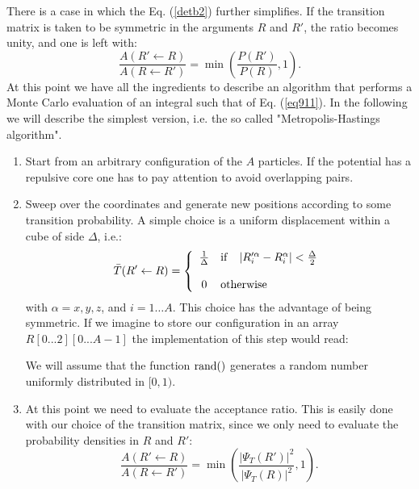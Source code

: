 There is a case in which the Eq. (\ref{detb2}) further simplifies. If the transition matrix is taken to 
be symmetric in the arguments $R$ and $R'$, the ratio becomes unity, and one is left with:
\begin{equation}
\frac{A(R'\leftarrow R)}{A(R\leftarrow R')}=\min\left(\frac{P(R')}{P(R)},1\right).
\label{detb2}
\end{equation} 
At this point we have all the ingredients to describe an algorithm that performs a Monte Carlo evaluation
of an integral such that of Eq. (\ref{eq911}). In the following we will describe the simplest version,
i.e. the so called "Metropolis-Hastings algorithm". 
\begin{enumerate}
	\item
	Start from an arbitrary configuration of the $A$ particles. If the potential has a repulsive core one has to pay attention to avoid overlapping pairs.
	\item
	Sweep over the coordinates and generate new positions according to some transition probability. A simple choice is a uniform displacement within a cube of side $\Delta$, i.e.:
	\begin{equation}
	  \bar{T}(R'\leftarrow R)=\left\{ 
	  \begin{array}{cl}
	  \frac{1}{\Delta}&{\rm if \ \ \  } |R'^\alpha_i-R^\alpha_i|<\frac{\Delta}{2}\\
	  \\
	  0&{\rm otherwise}
	  \end{array}
	     \right.
	\end{equation}
	with $\alpha =x,y,z$, and $i=1\dots A$. This choice has the advantage of being symmetric. If we imagine
	to store our configuration in an array $R[0...2][0...A-1]$ the implementation of this step would read:
	\begin{algorithmic} 
		\EndFor
		\EndFor
	\end{algorithmic}
    We will assume that the function ${\rm rand}()$ generates a random number uniformly distributed
    in $[0,1)$.
    \item 
    At this point we need to evaluate the acceptance ratio. This is easily done with our choice of the transition matrix, since we only need to evaluate the probability densities in $R$ and $R'$:
    \begin{equation}
    \frac{A(R'\leftarrow R)}{A(R\leftarrow R')}=\min\left(\frac{|\Psi_T(R')|^2}{|\Psi_T(R)|^2},1\right).

\end{equation}
\end{enumerate}
